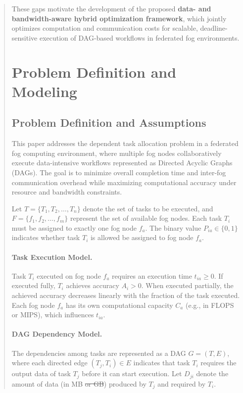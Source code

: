 \documentclass[conference]{IEEEtran}
\newcommand{\anninsert}[2]{{\color{#1}#2}}
\newcommand{\anninsert}[2]{#2}
\newcommand{\af}[1]{\anninsert{violet}{#1}}
\begin{document}
\begin{abstract}
These gaps motivate the development of the proposed \textbf{data- and bandwidth-aware hybrid optimization framework}, which jointly optimizes computation and communication costs for scalable, deadline-sensitive execution of DAG-based workflows in federated fog environments.



\section{Problem Definition and Modeling}
\label{model}

\subsection{Problem Definition and Assumptions}

This paper addresses the dependent task allocation problem in a federated fog computing environment, where multiple fog nodes collaboratively execute data-intensive workflows represented as Directed Acyclic Graphs (DAGs). The goal is to minimize overall completion time and inter-fog communication overhead while maximizing computational accuracy under resource and bandwidth constraints.

Let \( T = \{T_1, T_2, \dots, T_n\} \) denote the set of tasks to be executed, and \( F = \{f_1, f_2, \dots, f_m\} \) represent the set of available fog nodes. Each task \( T_i \) must be assigned to exactly one fog node \( f_a \). \af{The binary value \( P_{ia} \in \{0,1\} \) indicates whether task \( T_i \) is allowed be assigned to fog node \( f_a \).}

\paragraph*{Task Execution Model.}  
Task \( T_i \) executed on fog node \( f_a \) requires an execution time \( t_{ia} \geq 0 \). If executed fully, \( T_i \) achieves accuracy \( A_i > 0 \). When executed partially, the achieved accuracy decreases linearly with the fraction of the task executed. Each fog node \( f_a \) has its own computational capacity \( C_a \) (e.g., in FLOPS or MIPS), which influences \( t_{ia} \).

\paragraph*{DAG Dependency Model.}  
The dependencies among tasks are represented as a DAG \( G = (T, E) \), where each directed edge \((T_j, T_i) \in E\) indicates that task \( T_i \) requires the output data of task \( T_j \) before it can start execution. Let \( D_{ji} \) denote the amount of data (in MB\af{\sout{ or GB}}) produced by \( T_j \) and required by \( T_i \).  


\end{abstract}
\end{document}
